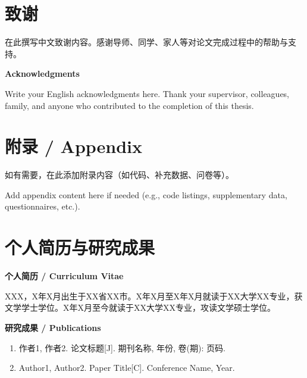 \documentclass[a4paper,12pt,openright]{ctexrep}
\begin{document}



\chapter*{致\quad 谢}

在此撰写中文致谢内容。感谢导师、同学、家人等对论文完成过程中的帮助与支持。

\vspace{1cm}
\begin{center}
{\large \textbf{Acknowledgments}}
\end{center}
\vspace{0.3cm}

Write your English acknowledgments here. Thank your supervisor, colleagues, family, and anyone who contributed to the completion of this thesis.

\appendix
\chapter{附录 / Appendix}
如有需要，在此添加附录内容（如代码、补充数据、问卷等）。

Add appendix content here if needed (e.g., code listings, supplementary data, questionnaires, etc.).


\chapter*{个人简历与研究成果}

\noindent\textbf{个人简历 / Curriculum Vitae}

\noindent XXX，X年X月出生于XX省XX市。X年X月至X年X月就读于XX大学XX专业，获文学学士学位。X年X月至今就读于XX大学XX专业，攻读文学硕士学位。

\vspace{0.5cm}
\noindent\textbf{研究成果 / Publications}

\begin{enumerate}
\item 作者1, 作者2. 论文标题[J]. 期刊名称, 年份, 卷(期): 页码.
\item Author1, Author2. Paper Title[C]. Conference Name, Year.
\end{enumerate}
\end{document}
